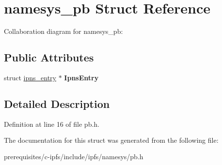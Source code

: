 \hypertarget{structnamesys__pb}{}\section{namesys\+\_\+pb Struct Reference}
\label{structnamesys__pb}


Collaboration diagram for namesys\+\_\+pb\+:
\subsection*{Public Attributes}
\begin{DoxyCompactItemize}
\item 
\mbox{\label{structnamesys__pb_adb75fe4588c95eee22b37e52c40f26ac}} 
struct \mbox{\hyperlink{structipns__entry}{ipns\+\_\+entry}} $\ast$ {\bfseries Ipns\+Entry}
\end{DoxyCompactItemize}


\subsection{Detailed Description}


Definition at line 16 of file pb.\+h.



The documentation for this struct was generated from the following file\+:\begin{DoxyCompactItemize}
\item 
prerequisites/c-\/ipfs/include/ipfs/namesys/pb.\+h\end{DoxyCompactItemize}
